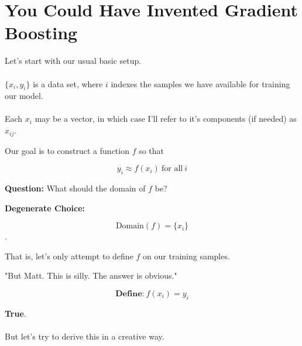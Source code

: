 \section{You Could Have Invented Gradient Boosting}
%
\begin{frame}
Let's start with our usual basic setup.\\~\\

$\{ x_i, y_i \}$ is a data set, where $i$ indexes the samples we have available for training our model.\\~\\

Each $x_i$ may be a vector, in which case I'll refer to it's components (if needed) as $x_{ij}$.
\end{frame}
%
\begin{frame}
Our goal is to construct a function $f$ so that

$$ y_i \approx f(x_i) \ \text{for all} \ i $$

\end{frame}
%
\begin{frame}
\textbf{Question:} What should the domain of $f$ be?
\end{frame}
%
\begin{frame}
\textbf{Degenerate Choice:} 

$$\text{Domain}(f) = \{x_i\}$$.

That is, let's only attempt to define $f$ on our training samples.
\end{frame}
%
\begin{frame}
\begin{center}
"But Matt.  This is silly.  The answer is obvious."
\end{center}

$$ \textbf{Define:} \ f(x_i) = y_i $$
\end{frame}
%
\begin{frame}
\textbf{True}.\\~\\

But let's try to derive this in a creative way.
\end{frame}
%
